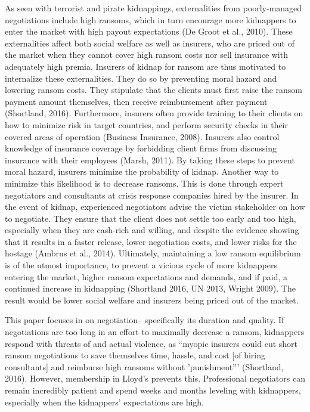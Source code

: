 \documentclass[12pt]{article}
\theoremstyle{plain}
\begin{document}
As seen with terrorist and pirate kidnappings, externalities from poorly-managed negotiations include high ransoms, which in turn encourage more kidnappers to enter the market with high payout expectations (De Groot et al., 2010). These externalities affect both social welfare as well as insurers, who are priced out of the market when they cannot cover high ransom costs nor sell insurance with adequately high premia. Insurers of kidnap for ransom are thus motivated to internalize these externalities. They do so by preventing moral hazard and lowering ransom costs. They stipulate that the clients must first raise the ransom payment amount themselves, then receive reimbursement after payment (Shortland, 2016). Furthermore, insurers often provide training to their clients on how to minimize risk in target countries, and perform security checks in their covered areas of operation (Business Insurance, 2008). Insurers also control knowledge of insurance coverage by forbidding client firms from discussing insurance with their employees (Marsh, 2011). By taking these steps to prevent moral hazard, insurers minimize the probability of kidnap. Another way to minimize this likelihood is to decrease ransoms. This is done through expert negotiators and consultants at crisis response companies hired by the insurer. In the event of kidnap, experienced negotiators advise the victim stakeholder on how to negotiate. They ensure that the client does not settle too early and too high, especially when they are cash-rich and willing, and despite the evidence showing that it results in a faster release, lower negotiation costs, and lower risks for the hostage (Ambrus et al., 2014). Ultimately, maintaining a low ransom equilibrium is of the utmost importance, to prevent a vicious cycle of more kidnappers entering the market, higher ransom expectations and demands, and if paid, a continued increase in kidnapping (Shortland 2016, UN 2013, Wright 2009). The result would be lower social welfare and insurers being priced out of the market. 

This paper focuses in on negotiation-- specifically its duration and quality. If negotiations are too long in an effort to maximally decrease a ransom, kidnappers respond with threats of and actual violence, as ``myopic insurers could cut short ransom negotiations to save themselves time, hassle, and cost [of hiring consultants] and reimburse high ransoms without 'punishment''' (Shortland, 2016). However, membership in Lloyd's prevents this. Professional negotiators can remain incredibly patient and spend weeks and months leveling with kidnappers, especially when the kidnappers' expectations are high. 
\end{document}
